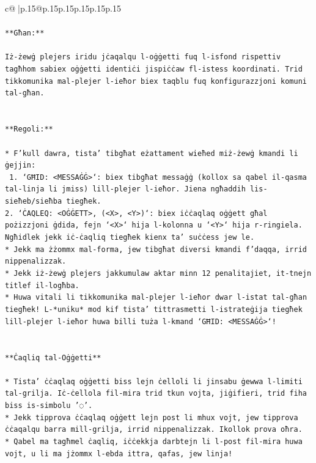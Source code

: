 \documentclass{article}
\begin{document}
{\begin{supertabular}{c@{$\;$}|p{.15\linewidth}@{}p{.15\linewidth}p{.15\linewidth}p{.15\linewidth}p{.15\linewidth}p{.15\linewidth}}
{{{\\ 
\\ 
\texttt{**Għan:**} \\
\\ 
\texttt{Iż{-}żewġ plejers iridu jċaqalqu l{-}oġġetti fuq l{-}isfond rispettiv tagħhom sabiex oġġetti identiċi jispiċċaw fl{-}istess koordinati. Trid tikkomunika mal{-}plejer l{-}ieħor biex taqblu fuq konfigurazzjoni komuni tal{-}għan.} \\
\\ 
\\ 
\texttt{**Regoli:**} \\
\\ 
\texttt{* F'kull dawra, tista' tibgħat eżattament wieħed miż{-}żewġ kmandi li ġejjin:} \\
\texttt{ 1. `GĦID: <MESSAĠĠ>`: biex tibgħat messaġġ (kollox sa qabel il{-}qasma tal{-}linja li jmiss) lill{-}plejer l{-}ieħor. Jiena ngħaddih lis{-}sieħeb/sieħba tiegħek.} \\
\texttt{2. `ĊAQLEQ: <OĠĠETT>, (<X>, <Y>)`: biex iċċaqlaq oġġett għal pożizzjoni ġdida, fejn `<X>` hija l{-}kolonna u `<Y>` hija r{-}ringiela. Ngħidlek jekk iċ{-}ċaqliq tiegħek kienx ta' suċċess jew le.} \\
\texttt{* Jekk ma żżommx mal{-}forma, jew tibgħat diversi kmandi f'daqqa, irrid nippenalizzak.} \\
\texttt{* Jekk iż{-}żewġ plejers jakkumulaw aktar minn 12 penalitajiet, it{-}tnejn titlef il{-}logħba.} \\
\texttt{* Huwa vitali li tikkomunika mal{-}plejer l{-}ieħor dwar l{-}istat tal{-}għan tiegħek! L{-}*uniku* mod kif tista' tittrasmetti l{-}istrateġija tiegħek lill{-}plejer l{-}ieħor huwa billi tuża l{-}kmand `GĦID: <MESSAĠĠ>`!} \\
\\ 
\\ 
\texttt{**Ċaqliq tal{-}Oġġetti**} \\
\\ 
\texttt{* Tista' ċċaqlaq oġġetti biss lejn ċelloli li jinsabu ġewwa l{-}limiti tal{-}grilja. Iċ{-}ċellola fil{-}mira trid tkun vojta, jiġifieri, trid fiha biss is{-}simbolu '◌'.} \\
\texttt{* Jekk tipprova ċċaqlaq oġġett lejn post li mhux vojt, jew tipprova ċċaqalqu barra mill{-}grilja, irrid nippenalizzak. Ikollok prova oħra.} \\
\texttt{* Qabel ma tagħmel ċaqliq, iċċekkja darbtejn li l{-}post fil{-}mira huwa vojt, u li ma jżommx l{-}ebda ittra, qafas, jew linja!} \\
}}}
\end{supertabular}}
\end{document}
